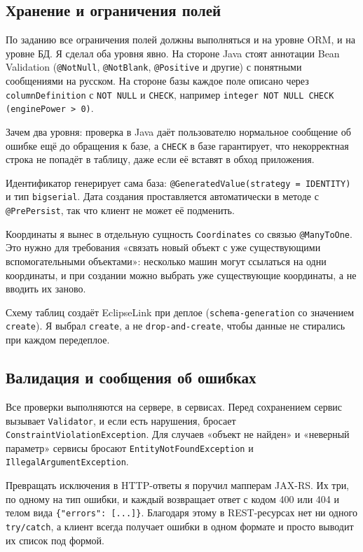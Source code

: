 \documentclass[a4paper,12pt]{article}
\begin{document}
\subsection{Хранение и ограничения полей}

По заданию все ограничения полей должны выполняться и на уровне ORM, и на уровне БД. Я сделал оба уровня явно. На стороне Java стоят аннотации Bean Validation (\texttt{@NotNull}, \texttt{@NotBlank}, \texttt{@Positive} и другие) с понятными сообщениями на русском. На стороне базы каждое поле описано через \texttt{columnDefinition} с \texttt{NOT NULL} и \texttt{CHECK}, например \texttt{integer NOT NULL CHECK (enginePower > 0)}.

Зачем два уровня: проверка в Java даёт пользователю нормальное сообщение об ошибке ещё до обращения к базе, а \texttt{CHECK} в базе гарантирует, что некорректная строка не попадёт в таблицу, даже если её вставят в обход приложения.

Идентификатор генерирует сама база: \texttt{@GeneratedValue(strategy = IDENTITY)} и тип \texttt{bigserial}. Дата создания проставляется автоматически в методе с \texttt{@PrePersist}, так что клиент не может её подменить.

Координаты я вынес в отдельную сущность \texttt{Coordinates} со связью \texttt{@ManyToOne}. Это нужно для требования «связать новый объект с уже существующими вспомогательными объектами»: несколько машин могут ссылаться на одни координаты, и при создании можно выбрать уже существующие координаты, а не вводить их заново.

Схему таблиц создаёт EclipseLink при деплое (\texttt{schema-generation} со значением \texttt{create}). Я выбрал \texttt{create}, а не \texttt{drop-and-create}, чтобы данные не стирались при каждом передеплое.

\subsection{Валидация и сообщения об ошибках}

Все проверки выполняются на сервере, в сервисах. Перед сохранением сервис вызывает \texttt{Validator}, и если есть нарушения, бросает \texttt{ConstraintViolationException}. Для случаев «объект не найден» и «неверный параметр» сервисы бросают \texttt{EntityNotFoundException} и \texttt{IllegalArgumentException}.

Превращать исключения в HTTP-ответы я поручил мапперам JAX-RS. Их три, по одному на тип ошибки, и каждый возвращает ответ с кодом 400 или 404 и телом вида \texttt{\{"errors": [...]\}}. Благодаря этому в REST-ресурсах нет ни одного \texttt{try/catch}, а клиент всегда получает ошибки в одном формате и просто выводит их список под формой.
\end{document}
